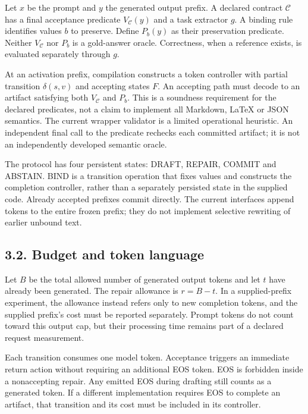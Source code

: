 \documentclass[
  12pt,
  a4paper,
]{article}
\begin{document}
Let \(x\) be the prompt and \(y\) the generated output prefix. A
declared contract \(\mathcal C\) has a final acceptance predicate
\(V_{\mathcal C}(y)\) and a task extractor \(g\). A binding rule
identifies values \(b\) to preserve. Define \(P_b(y)\) as their
preservation predicate. Neither \(V_{\mathcal C}\) nor \(P_b\) is a
gold-answer oracle. Correctness, when a reference exists, is evaluated
separately through \(g\).

At an activation prefix, compilation constructs a token controller with
partial transition \(\delta(s,v)\) and accepting states \(F\). An
accepting path must decode to an artifact satisfying both
\(V_{\mathcal C}\) and \(P_b\). This is a soundness requirement for the
declared predicates, not a claim to implement all Markdown, LaTeX or
JSON semantics. The current wrapper validator is a limited operational
heuristic. An independent final call to the predicate rechecks each
committed artifact; it is not an independently developed semantic
oracle.

The protocol has four persistent states: DRAFT, REPAIR, COMMIT and
ABSTAIN. BIND is a transition operation that fixes values and constructs
the completion controller, rather than a separately persisted state in
the supplied code. Already accepted prefixes commit directly. The
current interfaces append tokens to the entire frozen prefix; they do
not implement selective rewriting of earlier unbound text.

\subsection{3.2. Budget and token
language}\label{budget-and-token-language}

Let \(B\) be the total allowed number of generated output tokens and let
\(t\) have already been generated. The repair allowance is \(r=B-t\). In
a supplied-prefix experiment, the allowance instead refers only to new
completion tokens, and the supplied prefix's cost must be reported
separately. Prompt tokens do not count toward this output cap, but their
processing time remains part of a declared request measurement.

Each transition consumes one model token. Acceptance triggers an
immediate return action without requiring an additional EOS token. EOS
is forbidden inside a nonaccepting repair. Any emitted EOS during
drafting still counts as a generated token. If a different
implementation requires EOS to complete an artifact, that transition and
its cost must be included in its controller.
\end{document}

